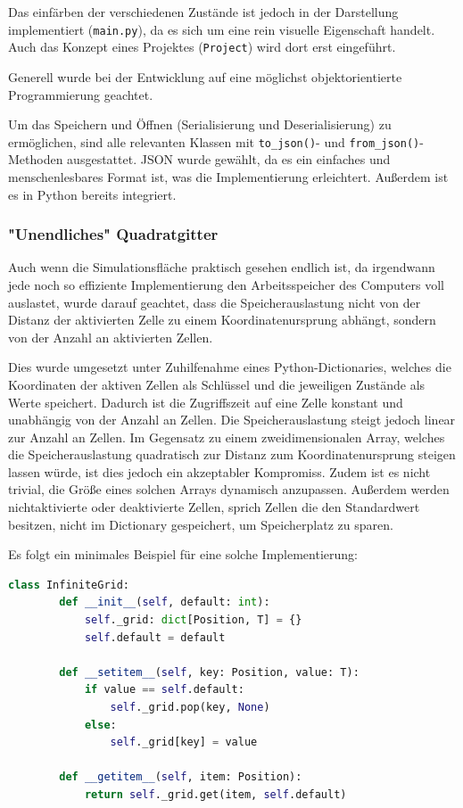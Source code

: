 Das einfärben der verschiedenen Zustände ist jedoch in der Darstellung implementiert (\texttt{main.py}), da es sich um eine rein visuelle Eigenschaft handelt. Auch das Konzept eines Projektes (\texttt{Project}) wird dort erst eingeführt.

Generell wurde bei der Entwicklung auf eine möglichst objektorientierte Programmierung geachtet.

Um das Speichern und Öffnen (Serialisierung und Deserialisierung) zu ermöglichen, sind alle relevanten Klassen mit \texttt{to\_json()}- und \texttt{from\_json()}-Methoden ausgestattet. JSON \cite{json} wurde gewählt, da es ein einfaches und menschenlesbares Format ist, was die Implementierung erleichtert. Außerdem ist es in Python bereits integriert.

\subsubsection{"Unendliches" Quadratgitter}
Auch wenn die Simulationsfläche praktisch gesehen endlich ist, da irgendwann jede noch so effiziente Implementierung den Arbeitsspeicher des Computers voll auslastet, wurde darauf geachtet, dass die Speicherauslastung nicht von der Distanz der aktivierten Zelle zu einem Koordinatenursprung abhängt, sondern von der Anzahl an aktivierten Zellen.

Dies wurde umgesetzt unter Zuhilfenahme eines Python-Dictionaries, welches die Koordinaten der aktiven Zellen als Schlüssel und die jeweiligen Zustände als Werte speichert. Dadurch ist die Zugriffszeit auf eine Zelle konstant und unabhängig von der Anzahl an Zellen. Die Speicherauslastung steigt jedoch linear zur Anzahl an Zellen. Im Gegensatz zu einem zweidimensionalen Array, welches die Speicherauslastung quadratisch zur Distanz zum Koordinatenursprung steigen lassen würde, ist dies jedoch ein akzeptabler Kompromiss. Zudem ist es nicht trivial, die Größe eines solchen Arrays dynamisch anzupassen. Außerdem werden nichtaktivierte oder deaktivierte Zellen, sprich Zellen die den Standardwert besitzen, nicht im Dictionary gespeichert, um Speicherplatz zu sparen.

Es folgt ein minimales Beispiel für eine solche Implementierung:

\begin{lstlisting}[language=Python]
    class InfiniteGrid:
        def __init__(self, default: int):
            self._grid: dict[Position, T] = {}
            self.default = default

        def __setitem__(self, key: Position, value: T):
            if value == self.default:
                self._grid.pop(key, None)
            else:
                self._grid[key] = value

        def __getitem__(self, item: Position):
            return self._grid.get(item, self.default)

\end{lstlisting}

